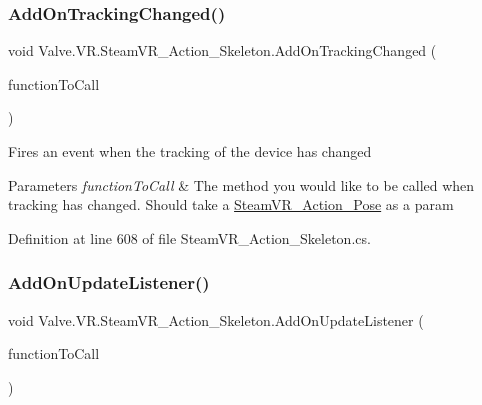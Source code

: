 \subsubsection{\texorpdfstring{AddOnTrackingChanged()}{AddOnTrackingChanged()}}
{\footnotesize\ttfamily void Valve.\+V\+R.\+Steam\+V\+R\+\_\+\+Action\+\_\+\+Skeleton.\+Add\+On\+Tracking\+Changed (\begin{DoxyParamCaption}\item[{\mbox{\hyperlink{class_valve_1_1_v_r_1_1_steam_v_r___action___skeleton_a460bcda41aa359ec14435212bed2b856}{Tracking\+Change\+Handler}}}]{function\+To\+Call }\end{DoxyParamCaption})}



Fires an event when the tracking of the device has changed 


\begin{DoxyParams}{Parameters}
{\em function\+To\+Call} & The method you would like to be called when tracking has changed. Should take a \mbox{\hyperlink{class_valve_1_1_v_r_1_1_steam_v_r___action___pose}{Steam\+V\+R\+\_\+\+Action\+\_\+\+Pose}} as a param\\
\hline
\end{DoxyParams}


Definition at line 608 of file Steam\+V\+R\+\_\+\+Action\+\_\+\+Skeleton.\+cs.

\mbox{\label{class_valve_1_1_v_r_1_1_steam_v_r___action___skeleton_a0016992d8adb267fcdd385487bcde9bd}} 
\subsubsection{\texorpdfstring{AddOnUpdateListener()}{AddOnUpdateListener()}}
{\footnotesize\ttfamily void Valve.\+V\+R.\+Steam\+V\+R\+\_\+\+Action\+\_\+\+Skeleton.\+Add\+On\+Update\+Listener (\begin{DoxyParamCaption}\item[{\mbox{\hyperlink{class_valve_1_1_v_r_1_1_steam_v_r___action___skeleton_a9fd666c2f3ccefc435275d85c525337c}{Update\+Handler}}}]{function\+To\+Call }\end{DoxyParamCaption})}



